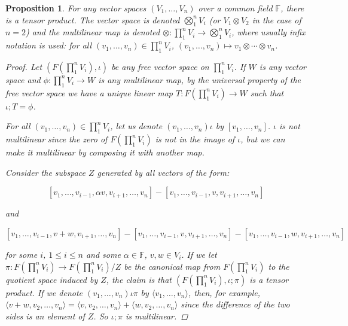\documentclass[a4paper,14pt]{article}
\newtheorem*{prop}{Proposition}
\begin{document}
\begin{prop}
For any vector spaces $(V_1, \ldots, V_n)$ over a common field $\mathbb{F}$, there is a tensor product. The vector space is denoted $\bigotimes_1^n V_i$ (or $V_1 \otimes V_2$ in the case of $n = 2$) and the multilinear map is denoted $\otimes: \prod_1^n V_i \to \bigotimes_1^n V_i$, where usually infix notation is used: for all $(v_1, \ldots, v_n) \in \prod_1^n V_i$, $(v_1, \ldots, v_n) \mapsto v_1 \otimes \cdots \otimes v_n$.
\begin{proof}
    Let $(F(\prod_1^n V_i), \iota)$ be any free vector space on $\prod_1^n V_i$. If $W$ is any vector space and $\phi: \prod_1^n V_i \to W$ is any multilinear map, by the universal property of the free vector space we have a unique linear map $T: F(\prod_1^n V_i) \to W$ such that $\iota;T = \phi$.

\begin{center}
\end{center}

For all $(v_1, \ldots, v_n) \in \prod_1^n V_i$, let us denote $(v_1, \ldots, v_n) \iota$ by $[v_1, \ldots, v_n]$. $\iota$ is not multilinear since the zero of $F(\prod_1^n V_i)$ is not in the image of $\iota$, but we can make it multilinear by composing it with another map.

Consider the subspace $Z$ generated by all vectors of the form:

$$[v_1, \dots, v_{i-1}, \alpha v, v_{i+1}, \dots, v_n] - [v_1, \dots, v_{i-1}, v, v_{i+1}, \dots, v_n]$$

and

$$[v_1, \dots, v_{i-1}, v + w, v_{i+1}, \dots, v_n] - [v_1, \dots, v_{i-1}, v, v_{i+1}, \dots, v_n] - [v_1, \dots, v_{i-1}, w, v_{i+1}, \dots, v_n]$$

for some $i$, $1 \leq i \leq n$ and some $\alpha \in \mathbb{F}$, $v, w \in V_i$. If we let $\pi: F(\prod_1^n V_i) \to F(\prod_1^n V_i) / Z$ be the canonical map from $F(\prod_1^n V_i)$ to the quotient space induced by $Z$, the claim is that $(F(\prod_1^n V_i), \iota; \pi)$ is a tensor product. If we denote $(v_1, \dots, v_n) \iota \pi$ by $\langle v_1, \dots, v_n \rangle$, then, for example, $\langle v + w, v_2, \dots, v_n \rangle = \langle v, v_2, \dots, v_n \rangle + \langle w, v_2, \dots, v_n \rangle$ since the difference of the two sides is an element of $Z$. So $\iota ; \pi$ is multilinear.


\end{proof}
\end{prop}
\end{document}
